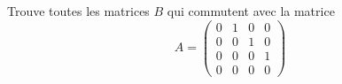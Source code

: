\begin{exercice}\label{exoLineraire0012}

Trouve toutes les matrices $B$ qui commutent avec la matrice
\begin{equation}
	A=\begin{pmatrix}
 0	&	1	&	0	&	0	\\ 
 0	&	0	&	1	&	0	\\ 
 0	&	0	&	0	&	1	\\ 
 0	&	0	&	0	&	0	 
 \end{pmatrix}
\end{equation}


\end{exercice}
